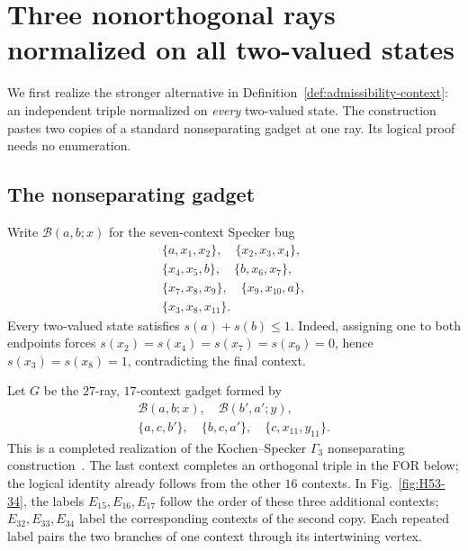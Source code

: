 \documentclass[aps,pra,reprint,superscriptaddress,longbibliography,nofootinbib,floatfix,10pt]{revtex4-2}
\theoremstyle{definition}\newtheorem{definition}[theorem]{Definition}
\theoremstyle{remark}\newtheorem{remark}[theorem]{Remark}
\begin{document}
\section{Three nonorthogonal rays normalized on all two-valued states}\label{sec:two-valued}
We first realize the stronger alternative in Definition~\ref{def:admissibility-context}: an independent triple normalized on \emph{every} two-valued state. The construction pastes two copies of a standard nonseparating gadget at one ray. Its logical proof needs no enumeration.
\subsection{The nonseparating gadget}

Write $\mathcal B(a,b;x)$ for the seven-context Specker bug~\cite{kochen1,2018-minimalYIYS}
\begin{equation}\label{eq:H53-bug}
\begin{gathered}
\{a,x_1,x_2\},\quad\{x_2,x_3,x_4\},\\
\{x_4,x_5,b\},\quad\{b,x_6,x_7\},\\
\{x_7,x_8,x_9\},\quad\{x_9,x_{10},a\},\\
\{x_3,x_8,x_{11}\}.
\end{gathered}
\end{equation}
Every two-valued state satisfies $s(a)+s(b)\le1$. Indeed, assigning one to both endpoints forces $s(x_2)=s(x_4)=s(x_7)=s(x_9)=0$, hence $s(x_3)=s(x_8)=1$, contradicting the final context.

Let $G$ be the $27$-ray, $17$-context gadget formed by
\begin{equation}\label{eq:H53-G}
\begin{gathered}
\mathcal B(a,b;x),\quad\mathcal B(b',a';y),\\
\{a,c,b'\},\quad\{b,c,a'\},\quad\{c,x_{11},y_{11}\}.
\end{gathered}
\end{equation}
This is a completed realization of the Kochen--Specker $\Gamma_3$ nonseparating construction~\cite{kochen1,svozil-2018-whycontexts}. The last context completes an orthogonal triple in the FOR below; the logical identity already follows from the other $16$ contexts. In Fig.~\ref{fig:H53-34}, the labels $E_{15},E_{16},E_{17}$ follow the order of these three additional contexts; $E_{32},E_{33},E_{34}$ label the corresponding contexts of the second copy. Each repeated label pairs the two branches of one context through its intertwining vertex.
\end{document}
